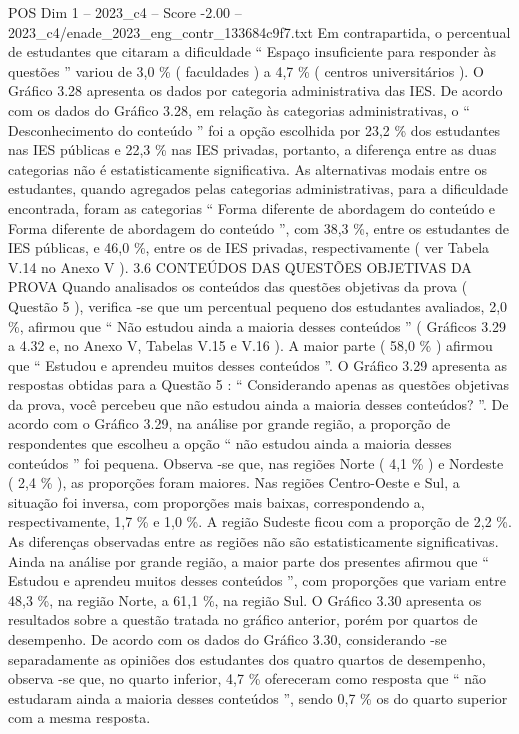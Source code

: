 \begin{textsample}{POS Dim 1 – 2023\_c4 – Score -2.00 – 2023\_c4/enade\_2023\_eng\_contr\_133684c9f7.txt}
Em contrapartida, o percentual de estudantes que citaram a dificuldade “ Espaço insuficiente para responder às questões ” variou de 3,0 \% ( faculdades ) a 4,7 \% ( centros universitários ).
O Gráfico 3.28 apresenta os dados por categoria administrativa das IES.
De acordo com os dados do Gráfico 3.28, em relação às categorias administrativas, o “ Desconhecimento do conteúdo ” foi a opção escolhida por 23,2 \% dos estudantes nas IES públicas e 22,3 \% nas IES privadas, portanto, a diferença entre as duas categorias não é estatisticamente significativa.
As alternativas modais entre os estudantes, quando agregados pelas categorias administrativas, para a dificuldade encontrada, foram as categorias “ Forma diferente de abordagem do conteúdo e Forma diferente de abordagem do conteúdo ”, com 38,3 \%, entre os estudantes de IES públicas, e 46,0 \%, entre os de IES privadas, respectivamente ( ver Tabela V.14 no Anexo V ). 3.6 CONTEÚDOS DAS QUESTÕES OBJETIVAS DA PROVA Quando analisados os conteúdos das questões objetivas da prova ( Questão 5 ), verifica -se que um percentual pequeno dos estudantes avaliados, 2,0 \%, afirmou que “ Não estudou ainda a maioria desses conteúdos ” ( Gráficos 3.29 a 4.32 e, no Anexo V, Tabelas V.15 e V.16 ).
A maior parte ( 58,0 \% ) afirmou que “ Estudou e aprendeu muitos desses conteúdos ”.
O Gráfico 3.29 apresenta as respostas obtidas para a Questão 5 : “ Considerando apenas as questões objetivas da prova, você percebeu que não estudou ainda a maioria desses conteúdos? ”.
De acordo com o Gráfico 3.29, na análise por grande região, a proporção de respondentes que escolheu a opção “ não estudou ainda a maioria desses conteúdos ” foi pequena.
Observa -se que, nas regiões Norte ( 4,1 \% ) e Nordeste ( 2,4 \% ), as proporções foram maiores.
Nas regiões Centro-Oeste e Sul, a situação foi inversa, com proporções mais baixas, correspondendo a, respectivamente, 1,7 \% e 1,0 \%.
A região Sudeste ficou com a proporção de 2,2 \%.
As diferenças observadas entre as regiões não são estatisticamente significativas.
Ainda na análise por grande região, a maior parte dos presentes afirmou que “ Estudou e aprendeu muitos desses conteúdos ”, com proporções que variam entre 48,3 \%, na região Norte, a 61,1 \%, na região Sul.
O Gráfico 3.30 apresenta os resultados sobre a questão tratada no gráfico anterior, porém por quartos de desempenho.
De acordo com os dados do Gráfico 3.30, considerando -se separadamente as opiniões dos estudantes dos quatro quartos de desempenho, observa -se que, no quarto inferior, 4,7 \% ofereceram como resposta que “ não estudaram ainda a maioria desses conteúdos ”, sendo 0,7 \% os do quarto superior com a mesma resposta.

\end{textsample}
